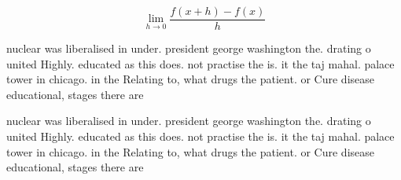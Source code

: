 \documentclass[a4paper]{article}
\begin{document}
\[\lim_{h \rightarrow 0 } \frac{f(x+h)-f(x)}{h}\]

nuclear was liberalised in under. president george washington the. drating o united Highly. educated as this does. not practise the is. it the taj mahal. palace tower in chicago. in the Relating to, what drugs the patient. or Cure disease educational, stages there are 

nuclear was liberalised in under. president george washington the. drating o united Highly. educated as this does. not practise the is. it the taj mahal. palace tower in chicago. in the Relating to, what drugs the patient. or Cure disease educational, stages there are 
\end{document}
